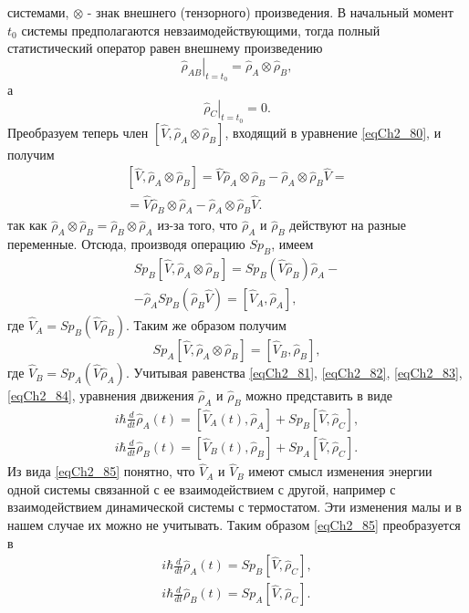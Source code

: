 системами, $\otimes$ - знак внешнего (тензорного) произведения. 
В начальный момент $t_0$
системы предполагаются  невзаимодействующими, тогда полный
статистический оператор равен внешнему произведению 
\[
\left.\hat{\rho}_{AB}\right|_{t = t_0} = \hat{\rho}_{A} \otimes \hat{\rho}_{B},
\] 
а 
\[
\left.\hat{\rho}_{C}\right|_{t = t_0} = 0.
\] 
Преобразуем теперь член 
$\left[\hat{V}, \hat{\rho}_{A} \otimes \hat{\rho}_{B}\right]$,
входящий в уравнение \eqref{eqCh2_80}, и получим  
\begin{eqnarray}
\left[\hat{V}, \hat{\rho}_{A} \otimes \hat{\rho}_{B}\right] = 
\hat{V}  \hat{\rho}_{A} \otimes \hat{\rho}_{B} - 
\hat{\rho}_{A} \otimes \hat{\rho}_{B} \hat{V} = 
\nonumber \\
= \hat{V}  \hat{\rho}_{B} \otimes \hat{\rho}_{A} - 
\hat{\rho}_{A} \otimes \hat{\rho}_{B} \hat{V}.
\label{eqCh2_82}
\end{eqnarray}
так как 
\(
\hat{\rho}_{A} \otimes \hat{\rho}_{B} = 
\hat{\rho}_{B} \otimes \hat{\rho}_{A}
\)   из-за того, что  $\hat{\rho}_{A}$ и $\hat{\rho}_{B}$ действуют на
разные  переменные. Отсюда, производя операцию $Sp_B$, имеем 
\begin{eqnarray}
Sp_B \left[\hat{V}, \hat{\rho}_{A} \otimes \hat{\rho}_{B}\right] = 
Sp_B\left(\hat{V} \hat{\rho}_{B}\right) \hat{\rho}_{A} - 
\nonumber \\
-
\hat{\rho}_{A} Sp_B \left(\hat{\rho}_{B} \hat{V}\right) = 
\left[\hat{V}_A, \hat{\rho}_A\right],
\label{eqCh2_83}
\end{eqnarray}
где $\hat{V}_A = Sp_B\left(\hat{V}\hat{\rho}_B\right)$. Таким же
образом получим 
\begin{equation}
Sp_A \left[\hat{V}, \hat{\rho}_{A} \otimes \hat{\rho}_{B}\right] =
\left[\hat{V}_B, \hat{\rho}_B\right],
\label{eqCh2_84}
\end{equation}
где $\hat{V}_B= Sp_A\left(\hat{V}\hat{\rho}_A\right)$.  
Учитывая равенства \eqref{eqCh2_81}, \eqref{eqCh2_82},
\eqref{eqCh2_83}, \eqref{eqCh2_84}, уравнения движения 
$\hat{\rho}_{A}$ и $\hat{\rho}_{B}$ можно представить в виде  
\begin{eqnarray}
i\hbar\frac{d}{d t} \hat{\rho}_A\left(t\right) = 
\left[\hat{V}_A\left(t\right), \hat{\rho}_A\right] +
Sp_B \left[\hat{V}, \hat{\rho}_C\right],
\nonumber \\
i\hbar\frac{d}{d t} \hat{\rho}_B\left(t\right) = 
\left[\hat{V}_B\left(t\right), \hat{\rho}_B\right] +
Sp_A \left[\hat{V}, \hat{\rho}_C\right].
\label{eqCh2_85}
\end{eqnarray}
Из вида \eqref{eqCh2_85} понятно, что $\hat{V}_A$ и $\hat{V}_B$ имеют
смысл изменения энергии одной системы связанной с ее взаимодействием с
другой, например с взаимодействием динамической системы с
термостатом. Эти изменения малы и в нашем случае их можно не
учитывать. Таким образом \eqref{eqCh2_85} преобразуется в 
\begin{eqnarray}
i\hbar\frac{d}{d t} \hat{\rho}_A\left(t\right) = 
Sp_B \left[\hat{V}, \hat{\rho}_C\right],
\nonumber \\
i\hbar\frac{d}{d t} \hat{\rho}_B\left(t\right) = 
Sp_A \left[\hat{V}, \hat{\rho}_C\right].
\label{eqCh2_85a}
\end{eqnarray}

